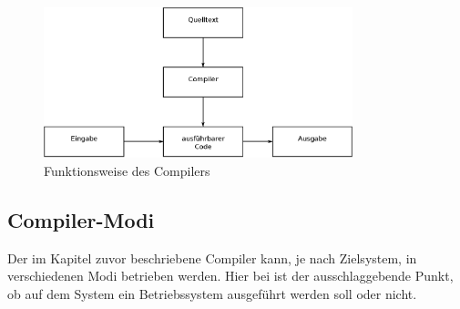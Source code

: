 \begin{figure}[H]
\centering
\includegraphics[width=0.8\textwidth]{Hauptteil/Compiler.eps}
\caption{Funktionsweise des Compilers}\label{fig:compiler}
\end{figure}

\subsection{Compiler-Modi}\label{kap:compilermode}

Der im Kapitel zuvor beschriebene Compiler kann, je nach Zielsystem, in verschiedenen Modi betrieben werden. Hier bei ist der ausschlaggebende Punkt, ob auf dem System ein Betriebssystem ausgeführt werden soll oder nicht.\\


